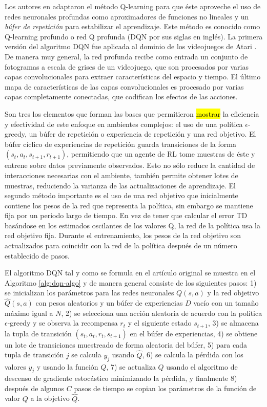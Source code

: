 Los autores en \cite{mnih2013playing} adaptaron el método Q-learning 
para que éste aproveche el uso de redes neuronales profundas como aproximadores
de funciones no lineales y un \textit{búfer de repetición} para estabilizar 
el aprendizaje. Este método es conocido como Q-learning profundo o red Q profunda (DQN por sus siglas en inglés).
La primera versión del algoritmo DQN fue aplicada al dominio de los videojuegos de Atari \cite{bellemare2013arcade}. De manera muy general, la red profunda recibe como entrada un conjunto de fotogramas a escala de grises de un videojuego, que son procesados por varias capas convolucionales para
extraer características del espacio y tiempo. El último mapa de características
de las capas convolucionales es procesado por varias capas completamente conectadas, que codifican los efectos de las acciones.

Son tres los elementos que forman las bases que permitieron \hl{mostrar}
la eficiencia y efectividad de este enfoque en ambientes complejos: el uso de una política $\epsilon$-greedy, un búfer de repetición o experiencia de repetición \cite{lin1993reinforcement} y una red objetivo.
El búfer cíclico de experiencias de repetición guarda transiciones de la forma 
$(s_t, a_t, s_{t+1}, r_{t+1})$, permitiendo que un agente de RL 
tome muestras de éste y entrene sobre datos previamente observados. 
Esto no sólo reduce la cantidad de interacciones necesarias con el ambiente,
también permite obtener lotes de muestras, reduciendo la varianza de 
las actualizaciones de aprendizaje. 
El segundo método importante es el uso de una red objetivo que inicialmente contiene los pesos de la red que representa la política, sin embargo se mantiene
fija por un periodo largo de tiempo.
En vez de tener que calcular el error TD basándose en los estimados
oscilantes de los valores Q, la red de la política usa la red objetivo fija.
Durante el entrenamiento, los pesos de la red objetivo son actualizados 
para coincidir con la red de la política después de un número establecido de pasos.

El algoritmo DQN tal y como se formula en el artículo original se muestra en el Algoritmo \ref{alg:dqn-algo} y de manera general consiste de los siguientes pasos: 1) se inicializan los parámetros para las redes neuronales $Q(s, a)$ y la red objetivo $\hat{Q}(s, a)$ con pesos aleatorios y 
un búfer de experiencias $D$ vacío con un tamaño máximo igual a $N$, 2) se selecciona
una acción aleatoria de acuerdo con la política $\epsilon$-greedy y se observa
la recompensa $r_t$ y el siguiente estado $s_{t+1}$, 3) se almacena la tupla
de transición $(s_t, a_t, r_t, s_{t+1})$ en el búfer de experiencias, 4)
se obtiene un lote de transiciones muestreado de forma aleatoria del búfer, 5)
para cada tupla de transición $j$ se calcula $y_j$ usando $\hat{Q}$, 6) se calcula la pérdida con los
valores $y_j$ y usando la función $Q$, 7) se actualiza $Q$ usando el algoritmo de descenso
de gradiente estocástico minimizando la pérdida, y finalmente 8) después de algunos $C$
pasos de tiempo se copian los parámetros de la función de valor $Q$ a la objetivo $\hat{Q}$.

